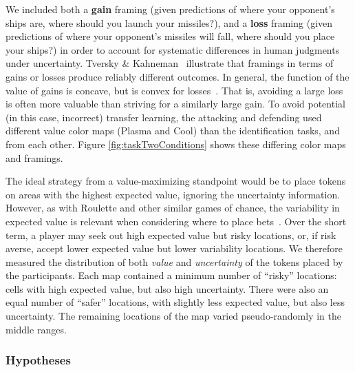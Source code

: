 \documentclass{vgtc}                          %
\begin{document}
We included both a \textbf{gain} framing (given predictions of where your opponent's ships are, where should you launch your missiles?), and a \textbf{loss} framing (given predictions of where your opponent's missiles will fall, where should you place your ships?) in order to account for systematic differences in human judgments under uncertainty. Tversky \& Kahneman~\cite{tversky1985framing} illustrate that framings in terms of gains or losses produce reliably different outcomes. In general, the function of the value of gains is concave, but is convex for losses~\cite{kahneman1979prospect}. That is, avoiding a large loss is often more valuable than striving for a similarly large gain. To avoid potential (in this case, incorrect) transfer learning, the attacking and defending used different value color maps (Plasma and Cool) than the identification tasks, and from each other.  Figure \ref{fig:taskTwoConditions} shows these differing color maps and framings.

The ideal strategy from a value-maximizing standpoint would be to place tokens on areas with the highest expected value, ignoring the uncertainty information. However, as with Roulette and other similar games of chance, the variability in expected value is relevant when considering where to place bets~\cite{mlodinow2009drunkard}. Over the short term, a player may seek out high expected value but risky locations, or, if risk averse, accept lower expected value but lower variability locations. We therefore measured the distribution of both \emph{value} and \emph{uncertainty} of the tokens placed by the participants. Each map contained a minimum number of ``risky'' locations: cells with high expected value, but also high uncertainty. There were also an equal number of ``safer'' locations, with slightly less expected value, but also less uncertainty. The remaining locations of the map varied pseudo-randomly in the middle ranges.



\subsubsection{Hypotheses}
\end{document}
